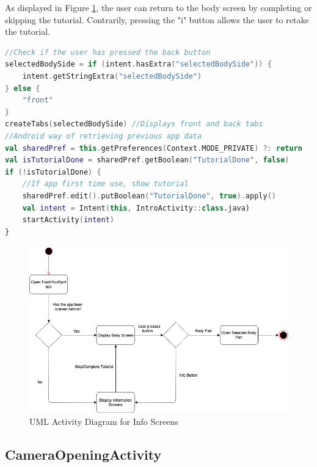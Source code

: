 As displayed in Figure \ref{fig:InfoDiagram}, the user can return to the body screen by completing or skipping the tutorial. Contrarily, pressing the "i" button allows the user to retake the tutorial. 

\begin{lstlisting}[caption={Displaying Information Screens}, label={lst:infoscreens}, language=Kotlin]
//Check if the user has pressed the back button
selectedBodySide = if (intent.hasExtra("selectedBodySide")) {
    intent.getStringExtra("selectedBodySide")
} else {
    "front"
}
createTabs(selectedBodySide) //Displays front and back tabs
//Android way of retrieving previous app data
val sharedPref = this.getPreferences(Context.MODE_PRIVATE) ?: return
val isTutorialDone = sharedPref.getBoolean("TutorialDone", false)
if (!isTutorialDone) {
    //If app first time use, show tutorial
    sharedPref.edit().putBoolean("TutorialDone", true).apply()
    val intent = Intent(this, IntroActivity::class.java)
    startActivity(intent)
}
\end{lstlisting}

\begin{figure}
    \includegraphics[width=1.2\textwidth, center]{figures/InfoDiagram.png}
    \caption{UML Activity Diagram for Info Screens}
    \label{fig:InfoDiagram}
\end{figure}

\subsection{CameraOpeningActivity} \label{sec:cameraarch}

